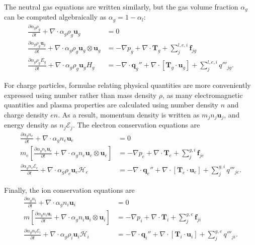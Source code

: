 The neutral gas equations are written similarly, but the gas volume fraction $\alpha_g$ can be computed algebraically as $\alpha_g = 1 - \alpha_l$:
\begin{subequations}
    \begin{align}
        \frac{\partial \alpha_g\rho_g}{\partial t} + \nabla \cdot \alpha_g\rho_g \mathbf{u}_g &= 0 \\
        \frac{\partial \alpha_g\rho_g\mathbf{u}_g}{\partial t} + \nabla \cdot \alpha_g\rho_g \mathbf{u}_g \otimes \mathbf{u}_g &= -\nabla p_g + \nabla \cdot \mathbf{T}_g + \sum_{j}^{l,e,i} \mathbf{f}_{jg} \\
        \frac{\partial \alpha_g\rho_g E_g}{\partial t} + \nabla \cdot \alpha_g\rho_g\mathbf{u}_g H_g &= -\nabla \cdot \mathbf{q}_g'' + \nabla \cdot \left[\mathbf{T}_g \cdot \mathbf{u}_g \right] + \sum_{j}^{l,e,i} q'''_{jg}.
    \end{align}
\end{subequations}

For charge particles, formulae relating physical quantities are more conveniently expressed using number rather than mass density $\rho$, as many electromagnetic quantities and plasma properties are calculated
using number density $n$ and charge density $en$. As a result, momentum density is written as $m_j n_j \mathbf{u}_j$, and energy density as $n_j \mathcal{E}_j$. The electron conservation equations are
\begin{subequations}
    \begin{align}
        \frac{\partial \alpha_g n_e}{\partial t} + \nabla \cdot \alpha_g n_e \mathbf{u}_e &= 0 \\
        m_e \left[ \frac{\partial \alpha_g n_e \mathbf{u}_e}{\partial t} + \nabla \cdot \alpha_g n_e \mathbf{u}_e \otimes \mathbf{u}_e \right] &= -\nabla p_e + \nabla \cdot \mathbf{T}_e + \sum_{j}^{g,i} \mathbf{f}_{je} \\
        \frac{\partial \alpha_g n_e \mathcal{E}_e}{\partial t} + \nabla \cdot \alpha_g \rho_e \mathbf{u}_e \mathcal{H}_e &= -\nabla \cdot \mathbf{q}_e'' + \nabla \cdot \left[\mathbf{T}_e \cdot \mathbf{u}_e \right] + \sum_{j}^{g,i} q'''_{je}.
    \end{align}    
\end{subequations}

Finally, the ion conservation equations are
\begin{subequations}
    \begin{align}
        \frac{\partial \alpha_g n_i}{\partial t} + \nabla \cdot \alpha_g n_i \mathbf{u}_i &= 0 \\
        m \left[ \frac{\partial \alpha_g n_i \mathbf{u}_i}{\partial t} + \nabla \cdot \alpha_g n_i \mathbf{u}_i \otimes \mathbf{u}_i \right] &= -\nabla p_i + \nabla \cdot \mathbf{T}_i + \sum_{j}^{g,e} \mathbf{f}_{ji} \\
        \frac{\partial \alpha_g n_i \mathcal{E}_i}{\partial t} + \nabla \cdot \alpha_g \rho_i \mathbf{u}_i \mathcal{H}_i &= -\nabla \cdot \mathbf{q}_i'' + \nabla \cdot \left[\mathbf{T}_i \cdot \mathbf{u}_i \right] + \sum_{j}^{g,e} q'''_{ji}.
    \end{align}    
\end{subequations}

